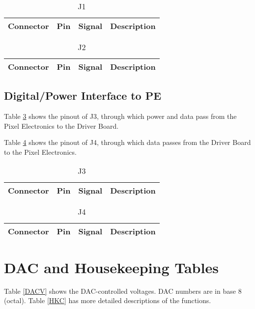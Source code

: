 \documentclass[a4paper,12pt]{article}
\begin{document}
\begin{table}[h]
\centering
\begin{tabular}{|l|l|l|l|}
\hline
 Connector & Pin & Signal & Description \\
\hline

\hline
\end{tabular}
\caption{J1}
\label{J1}
\end{table}

\begin{table}[h]
\centering
{\small
\begin{tabular}{|l|l|l|l|}
\hline
 Connector & Pin & Signal & Description \\
\hline

\hline
\end{tabular}
}
\caption{J2}
\label{J2}
\end{table}

\subsection{Digital/Power Interface to PE}

Table \ref{J3} shows the pinout of J3, through which power and data pass from the Pixel Electronics to the Driver Board.

Table \ref{J4} shows the pinout of J4, through which data passes from the Driver Board to the Pixel Electronics.

\begin{table}[h]
\centering
{\small
\begin{tabular}{|l|l|l|l|}
\hline
 Connector & Pin & Signal & Description \\
\hline

\hline
\end{tabular}
}
\caption{J3}
\label{J3}
\end{table}

\begin{table}[h]
\centering
{\small
\begin{tabular}{|l|l|l|l|}
\hline
 Connector & Pin & Signal & Description \\
\hline

\hline
\end{tabular}
}
\caption{J4}
\label{J4}
\end{table}

\clearpage
\section{DAC and Housekeeping Tables}

Table \ref{DACV} shows the DAC-controlled voltages. DAC numbers are in base 8 (octal). Table \ref{HKC} has more detailed descriptions of the functions.
\end{document}
